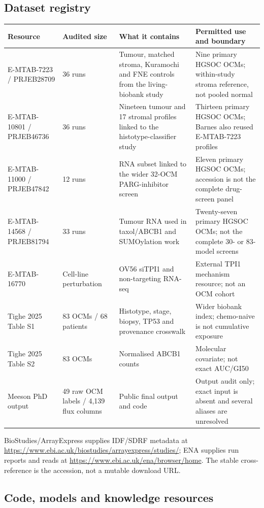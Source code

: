 \documentclass[10pt]{article}
\begin{document}
\subsection{Dataset registry}

\begin{longtable}{p{3.0cm}p{2.5cm}p{5.0cm}p{4.0cm}}
\toprule
Resource & Audited size & What it contains & Permitted use and boundary \\
\midrule
E-MTAB-7223 / PRJEB28709 & 36 runs & Tumour, matched stroma, Kuramochi and FNE controls from the living-biobank study & Nine primary HGSOC OCMs; within-study stroma reference, not pooled normal \\
E-MTAB-10801 / PRJEB46736 & 36 runs & Nineteen tumour and 17 stromal profiles linked to the histotype-classifier study & Thirteen primary HGSOC OCMs; Barnes also reused E-MTAB-7223 profiles \\
E-MTAB-11000 / PRJEB47842 & 12 runs & RNA subset linked to the wider 32-OCM PARG-inhibitor screen & Eleven primary HGSOC OCMs; accession is not the complete drug-screen panel \\
E-MTAB-14568 / PRJEB81794 & 33 runs & Tumour RNA used in taxol/ABCB1 and SUMOylation work & Twenty-seven primary HGSOC OCMs; not the complete 30- or 83-model screens \\
E-MTAB-16770 & Cell-line perturbation & OV56 siTPI1 and non-targeting RNA-seq & External TPI1 mechanism resource; not an OCM cohort \\
Tighe 2025 Table S1 & 83 OCMs / 68 patients & Histotype, stage, biopsy, TP53 and provenance crosswalk & Wider biobank index; chemo-naive is not cumulative exposure \\
Tighe 2025 Table S2 & 83 OCMs & Normalised ABCB1 counts & Molecular covariate; not exact AUC/GI50 \\
Meeson PhD output & 49 raw OCM labels / 4,139 flux columns & Public final output and code & Output audit only; exact input is absent and several aliases are unresolved \\
\bottomrule
\end{longtable}

BioStudies/ArrayExpress supplies IDF/SDRF metadata at
\url{https://www.ebi.ac.uk/biostudies/arrayexpress/studies/}; ENA supplies run
reports and reads at \url{https://www.ebi.ac.uk/ena/browser/home}.  The stable
cross-reference is the accession, not a mutable download URL.

\subsection{Code, models and knowledge resources}
\end{document}
